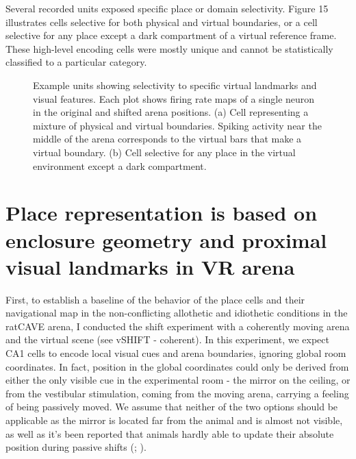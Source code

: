 Several recorded units exposed specific place or domain selectivity. Figure 15 illustrates cells selective for both physical and virtual boundaries, or a cell selective for any place except a dark compartment of a virtual reference frame. These high-level encoding cells were mostly unique and cannot be statistically classified to a particular category.

\begin{figure}
\captionsetup{format=plain}
\caption[Specific place cells]{
Example units showing selectivity to specific virtual landmarks and visual features. Each plot shows firing rate maps of a single neuron in the original and shifted arena positions. (a) Cell representing a mixture of physical and virtual boundaries. Spiking activity near the middle of the arena corresponds to the virtual bars that make a virtual boundary. (b) Cell selective for any place in the virtual environment except a dark compartment.
}
\label{fig:F15_specific_cells}
\end{figure}


\section{Place representation is based on enclosure geometry and proximal visual landmarks in VR arena}
\label{sec:env_geometry}

First, to establish a baseline of the behavior of the place cells and their navigational map in the non-conflicting allothetic and idiothetic conditions in the ratCAVE arena, I conducted the shift experiment with a coherently moving arena and the virtual scene (see vSHIFT - coherent). In this experiment, we expect CA1 cells to encode local visual cues and arena boundaries, ignoring global room coordinates. In fact, position in the global coordinates could only be derived from either the only visible cue in the experimental room - the mirror on the ceiling, or from the vestibular stimulation, coming from the moving arena, carrying a feeling of being passively moved. We assume that neither of the two options should be applicable as the mirror is located far from the animal and is almost not visible, as well as it’s been reported that animals hardly able to update their absolute position during passive shifts (\cite{Mittelstaedt1980}; \cite{Etienne1988}).

